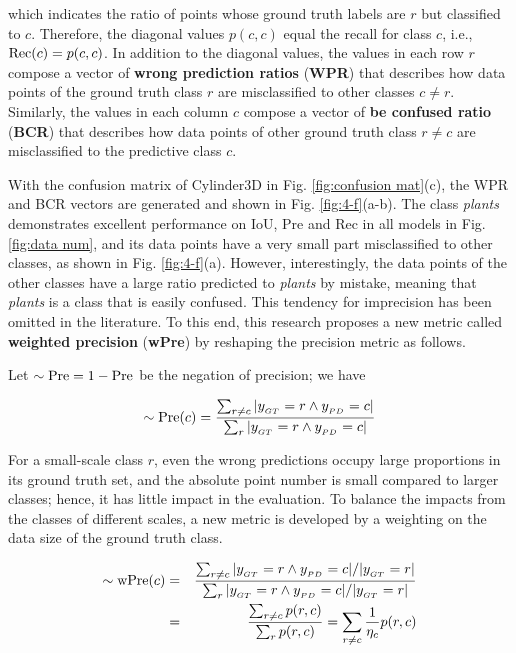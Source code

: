 \documentclass[journal]{IEEEtran}
\begin{document}
which indicates the ratio of points whose ground truth labels are $r$ but classified to $c$. Therefore, the diagonal values $p(c,c)$ equal the recall for class $c$, i.e., ${\rm Rec}(c) = p(c,c)$.
In addition to the diagonal values, the values in each row $r$ compose a vector of \textbf{wrong prediction ratios} (\textbf{WPR}) that describes how data points of the ground truth class $r$ are misclassified to other classes $c \ne r$. Similarly, the values in each column $c$ compose a vector of \textbf{be confused ratio} (\textbf{BCR}) that describes how data points of other ground truth class $r \ne c$ are misclassified to the predictive class $c$.

With the confusion matrix of Cylinder3D in Fig. \ref{fig:confusion mat}(c), the WPR and BCR vectors are generated and shown in Fig. \ref{fig:4-f}(a-b).
The class \textit{plants} demonstrates excellent performance on IoU, Pre and Rec
in all models in Fig. \ref{fig:data num}, and its data points have a very small part misclassified to other classes, as shown in Fig. \ref{fig:4-f}(a).
However, interestingly, the data points of the other classes have a large ratio predicted to \textit{plants} by mistake, meaning that \textit{plants} is a class that is easily confused.
This tendency for imprecision has been omitted in the literature.
To this end, this research proposes a new metric called \textbf{weighted precision} (\textbf{wPre}) by reshaping the precision metric as follows.

Let $\mathbf{\sim {\rm Pre}}=1-{\rm Pre}$ be the negation of precision; we have

\begin{equation}
\mathbf{\sim {\rm Pre}}(c) = \frac{\sum_{r \ne c}|y_{_{GT}}=r \land y_{_{PD}}=c|}{\sum_{r}|y_{_{GT}}=r \land y_{_{PD}}=c|}
\end{equation}

For a small-scale class $r$, even the wrong predictions occupy large proportions in its ground truth set, and the absolute point number is small compared to larger classes; hence, it has little impact in the evaluation. To balance the impacts from the classes of different scales, a new metric is developed by a weighting on the data size of the ground truth class.

\begin{eqnarray}
\mathbf{\sim {\rm wPre}}(c) &=& \frac{\sum_{r \ne c}|y_{_{GT}}=r \land y_{_{PD}}=c|/|y_{_{GT}}=r|}{\sum_{r}|y_{_{GT}}=r \land y_{_{PD}}=c|/|y_{_{GT}}=r|} \nonumber \\
&=& \frac{\sum_{r \ne c} p(r,c)}{\sum_{r} p(r,c)} = \sum_{r \ne c}\frac{1}{\eta_c}p(r,c)
\end{eqnarray}
\end{document}
